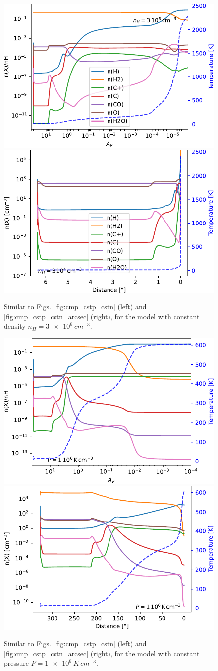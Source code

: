 \documentclass[12pt,a4paper]{article}
\begin{document}
\begin{figure}[h!]
    \centering
    \includegraphics[width=.48\textwidth]{struct_nH3e6.pdf}
    \includegraphics[width=.48\textwidth]{struct_nH3e6_arcsec.pdf}
    \caption{Similar to Figs.~\ref{fig:cmp_cstp_cstn} (left) and \ref{fig:cmp_cstp_cstn_arcsec} (right), for the model with constant density $n_H = \qty{3e6}{cm^{-3}}$.} \label{fig:struct_nH3e6}

    \vspace{2em}

    \includegraphics[width=.48\textwidth]{struct_P1e6.pdf}
    \includegraphics[width=.48\textwidth]{struct_P1e6_arcsec.pdf}
    \caption{Similar to Figs.~\ref{fig:cmp_cstp_cstn} (left) and \ref{fig:cmp_cstp_cstn_arcsec} (right), for the model with constant pressure $P = \qty{1e6}{K\,cm^{-3}}$.} \label{fig:struct_P1e6}


\end{figure}
\end{document}
